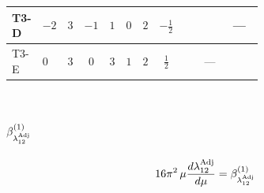 \documentclass[8pt]{article}
\begin{document}
\begin{landscape}
\begin{longtable}{@{}llcccccc >{\raggedright\arraybackslash}p{0.21\linewidth} >{\raggedright\arraybackslash}p{0.21\linewidth} >{\raggedright\arraybackslash}p{0.21\linewidth}@{}}
\midrule
T3-D & $-2$ & $3$ & $-1$ & $1$ & $0$ & $2$ & $-\frac{1}{2}$ & \scriptsize\adjustbox{max width=\linewidth}{$\begin{gathered} -\frac{9 {g_Y}^2 {\lambda_{T3}}}{2}\end{gathered}$} & \scriptsize\adjustbox{max width=\linewidth}{$\begin{gathered} {\lambda_{T3}} (6 \operatorname{Tr}\!\left({Y_d}\,\left({Y_d}\right)^{\dagger}\right)+2 \operatorname{Tr}\!\left({Y_e}\,\left({Y_e}\right)^{\dagger}\right)+6 \operatorname{Tr}\!\left({Y_u}\,\left({Y_u}\right)^{\dagger}\right)-4 {\lambda_{H1}^{\rm Adj}})\end{gathered}$} & --- \\
\midrule
T3-E & $0$ & $3$ & $0$ & $3$ & $1$ & $2$ & $\frac{1}{2}$ & \scriptsize\adjustbox{max width=\linewidth}{$\begin{gathered} -\frac{9 {g_Y}^2 {\lambda_{T3}}}{2}\end{gathered}$} & --- & \scriptsize\adjustbox{max width=\linewidth}{$\begin{gathered} {\lambda_{T3}} \left(6 \operatorname{Tr}\!\left({Y_d}\,\left({Y_d}\right)^{\dagger}\right)+2 \operatorname{Tr}\!\left({Y_e}\,\left({Y_e}\right)^{\dagger}\right)+6 \operatorname{Tr}\!\left({Y_u}\,\left({Y_u}\right)^{\dagger}\right)-\frac{4 {\lambda_{12}^{\rm Adj}}}{3}-2 {\lambda_{12}^{\rm Cross}}-2 {\lambda_{H1}^{\rm Adj}}-\frac{4 {\lambda_{H2}^{\rm Adj}}}{3}\right)\end{gathered}$} \\
\midrule
\bottomrule
\end{longtable}
\clearpage
\section*{$\beta_{\lambda_{12}^{\rm Adj}}^{(1)}$}
\[16\pi^2\,\mu\frac{d \lambda_{12}^{\rm Adj}}{d\mu}=\beta_{\lambda_{12}^{\rm Adj}}^{(1)}\]

\end{landscape}
\end{document}
